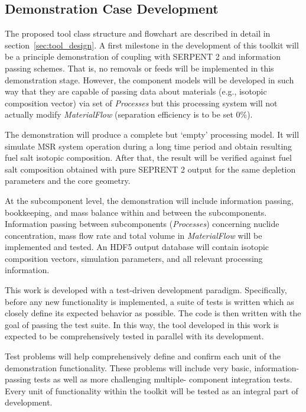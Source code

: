 \subsection{Demonstration Case Development}
The proposed tool class structure and flowchart are 
described in detail in section~\ref{sec:tool_design}.
A first milestone in the development of this toolkit will be a 
principle demonstration of coupling with SERPENT 2 and 
information passing schemes. That is, no removals or feeds 
will be implemented in this demonstration stage. However, 
the component models will be developed in such way that 
they are capable of passing data about materials (e.g., isotopic 
composition vector) via set of \textit{Processes} but this 
processing system will not actually modify \textit{MaterialFlow} 
(separation efficiency is to be set 0\%).

The demonstration will produce a complete but `empty' processing 
model. It will simulate \gls{MSR} system operation during 
a long time period and obtain resulting fuel salt isotopic composition. 
After that, the result will be verified against fuel salt 
composition obtained with pure SEPRENT 2 output for the same 
depletion parameters and the core geometry.%

At the subcomponent level, the demonstration will include information 
passing, bookkeeping, and mass balance within and between the 
subcomponents. Information passing between subcomponents 
(\textit{Processes}) concerning nuclide concentration, mass flow rate 
and total volume in \textit{MaterialFlow} will be implemented and tested. 
An HDF5 output database will contain 
isotopic composition vectors, simulation 
parameters, and all relevant processing information.

This work is developed with a test-driven development paradigm. 
Specifically, before any new functionality is implemented, a suite of 
tests is written which as closely define its expected behavior as 
possible. The code is then written with the goal of passing the test 
suite. In this way, the tool developed in this work is expected to be
comprehensively tested in parallel with its development.

Test problems will help comprehensively define and confirm each unit 
of the demonstration functionality. These problems will include very 
basic, information-passing tests as well as more challenging multiple-
component integration tests. Every unit of functionality
within the toolkit will be tested as an integral part of development.


